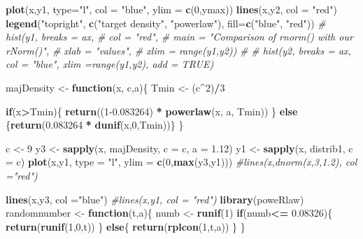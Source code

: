 \documentclass[
]{article}
\newenvironment{Shaded}{\begin{snugshade}}{\end{snugshade}}
\newcommand{\CommentTok}[1]{\textcolor[rgb]{0.56,0.35,0.01}{\textit{#1}}}
\newcommand{\ControlFlowTok}[1]{\textcolor[rgb]{0.13,0.29,0.53}{\textbf{#1}}}
\newcommand{\DataTypeTok}[1]{\textcolor[rgb]{0.13,0.29,0.53}{#1}}
\newcommand{\DecValTok}[1]{\textcolor[rgb]{0.00,0.00,0.81}{#1}}
\newcommand{\FloatTok}[1]{\textcolor[rgb]{0.00,0.00,0.81}{#1}}
\newcommand{\KeywordTok}[1]{\textcolor[rgb]{0.13,0.29,0.53}{\textbf{#1}}}
\newcommand{\NormalTok}[1]{#1}
\newcommand{\OperatorTok}[1]{\textcolor[rgb]{0.81,0.36,0.00}{\textbf{#1}}}
\newcommand{\StringTok}[1]{\textcolor[rgb]{0.31,0.60,0.02}{#1}}
\begin{document}
\begin{Shaded}
\begin{Highlighting}[]
\KeywordTok{plot}\NormalTok{(x,y1, }\DataTypeTok{type=}\StringTok{"l"}\NormalTok{, }\DataTypeTok{col =} \StringTok{"blue"}\NormalTok{, }\DataTypeTok{ylim =} \KeywordTok{c}\NormalTok{(}\DecValTok{0}\NormalTok{,ymax))}
\KeywordTok{lines}\NormalTok{(x,y2, }\DataTypeTok{col =} \StringTok{"red"}\NormalTok{)}
\KeywordTok{legend}\NormalTok{(}\StringTok{"topright"}\NormalTok{, }\KeywordTok{c}\NormalTok{(}\StringTok{"target density"}\NormalTok{, }\StringTok{"powerlaw"}\NormalTok{), }\DataTypeTok{fill=}\KeywordTok{c}\NormalTok{(}\StringTok{"blue"}\NormalTok{, }\StringTok{"red"}\NormalTok{))}
\CommentTok{# hist(y1, breaks = ax,}
\CommentTok{#      col = "red",}
\CommentTok{#      main = "Comparison of rnorm()  with our rNorm()",}
\CommentTok{#      xlab = "values",}
\CommentTok{#      xlim = range(y1,y2))}
\CommentTok{# }
\CommentTok{# hist(y2, breaks = ax, col = "blue",  xlim =range(y1,y2), add = TRUE)}

\NormalTok{majDensity <-}\StringTok{ }\ControlFlowTok{function}\NormalTok{(x, c,a)\{}
\NormalTok{  Tmin <-}\StringTok{ }\NormalTok{(c}\OperatorTok{^}\DecValTok{2}\NormalTok{)}\OperatorTok{/}\DecValTok{3}
  
  \ControlFlowTok{if}\NormalTok{(x}\OperatorTok{>}\NormalTok{Tmin)\{}
    \KeywordTok{return}\NormalTok{((}\DecValTok{1}\FloatTok{-0.083264}\NormalTok{) }\OperatorTok{*}\StringTok{ }\KeywordTok{powerlaw}\NormalTok{(x, a, Tmin))}
\NormalTok{  \}}
  \ControlFlowTok{else}\NormalTok{ \{}\KeywordTok{return}\NormalTok{(}\FloatTok{0.083264} \OperatorTok{*}\StringTok{ }\KeywordTok{dunif}\NormalTok{(x,}\DecValTok{0}\NormalTok{,Tmin))\}}
\NormalTok{\}}

\NormalTok{c <-}\StringTok{ }\DecValTok{9}
\NormalTok{y3 <-}\StringTok{ }\KeywordTok{sapply}\NormalTok{(x, majDensity, }\DataTypeTok{c =}\NormalTok{ c, }\DataTypeTok{a =} \FloatTok{1.12}\NormalTok{)}
\NormalTok{y1 <-}\StringTok{ }\KeywordTok{sapply}\NormalTok{(x, distrib1, }\DataTypeTok{c =}\NormalTok{ c)}
\KeywordTok{plot}\NormalTok{(x,y1, }\DataTypeTok{type =} \StringTok{"l"}\NormalTok{, }\DataTypeTok{ylim =} \KeywordTok{c}\NormalTok{(}\DecValTok{0}\NormalTok{,}\KeywordTok{max}\NormalTok{(y3,y1)))}
\CommentTok{#lines(x,dnorm(x,3,1.2), col ="red")}

\KeywordTok{lines}\NormalTok{(x,y3, }\DataTypeTok{col =}\StringTok{"blue"}\NormalTok{)}
\CommentTok{#lines(x,y1, col = "red")}
\KeywordTok{library}\NormalTok{(poweRlaw)}
\NormalTok{randomnumber <-}\StringTok{ }\ControlFlowTok{function}\NormalTok{(t,a)\{}
\NormalTok{  numb <-}\StringTok{ }\KeywordTok{runif}\NormalTok{(}\DecValTok{1}\NormalTok{)}
  \ControlFlowTok{if}\NormalTok{(numb}\OperatorTok{<=}\StringTok{ }\FloatTok{0.08326}\NormalTok{)\{}
    \KeywordTok{return}\NormalTok{(}\KeywordTok{runif}\NormalTok{(}\DecValTok{1}\NormalTok{,}\DecValTok{0}\NormalTok{,t))}
\NormalTok{  \}}
  \ControlFlowTok{else}\NormalTok{\{}
    \KeywordTok{return}\NormalTok{(}\KeywordTok{rplcon}\NormalTok{(}\DecValTok{1}\NormalTok{,t,a))}
\NormalTok{  \}}
\NormalTok{\}}


\end{Highlighting}
\end{Shaded}
\end{document}
